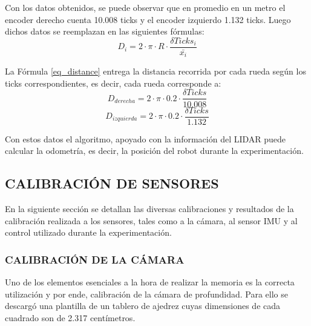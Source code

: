 Con los datos obtenidos, se puede observar que en promedio en un metro el encoder derecho cuenta 10.008 ticks y el encoder izquierdo 1.132 ticks. Luego dichos datos se reemplazan en las siguientes fórmulas:
\begin{equation}
    D_i = 2 \cdot \pi \cdot R \cdot \frac{\delta Ticks_i}{\bar{x_i}}
    \label{eq_distance}
\end{equation}

La Fórmula \ref{eq_distance} entrega la distancia recorrida por cada rueda según los ticks correspondientes, es decir, cada rueda corresponde a:
\begin{equation}
    D_{derecha} = 2 \cdot \pi \cdot 0.2 \cdot \frac{\delta Ticks}{10.008}
    \label{eq_distance}
\end{equation}
\begin{equation}
    D_{izquierda} = 2 \cdot \pi \cdot 0.2 \cdot \frac{\delta Ticks}{1.132}
    \label{eq_distance}
\end{equation}

Con estos datos el algoritmo, apoyado con la información del LIDAR puede calcular la odometría, es decir, la posición del robot durante la experimentación.

\subsection{CALIBRACIÓN DE SENSORES}

En la siguiente sección se detallan las diversas calibraciones y resultados de la calibración realizada a los sensores, tales como a la cámara, al sensor IMU y al control utilizado durante la experimentación.

\subsubsection{CALIBRACIÓN DE LA CÁMARA}
Uno de los elementos esenciales a la hora de realizar la memoria es la correcta utilización y por ende, calibración de la cámara de profundidad. Para ello se descargó una plantilla de un tablero de ajedrez cuyas dimensiones de cada cuadrado son de 2.317 centímetros.

